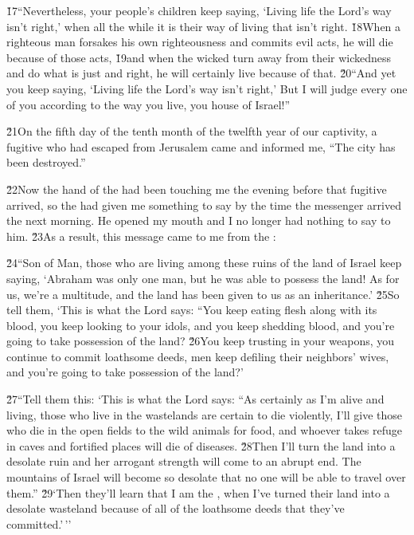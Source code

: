 \v{17}``Nevertheless, your people's children keep saying, `Living life the Lord's way isn't right,' when all the while it is their way of living that isn't right. \v{18}When a righteous man forsakes his own righteousness and commits evil acts, he will die because of those acts, \v{19}and when the wicked turn away from their wickedness and do what is just and right, he will certainly live because of that. \v{20}``And yet you keep saying, `Living life the Lord's way isn't right,' But I will judge every one of you according to the way you live, you house of Israel!''

\v{21}On the fifth day of the tenth month of the twelfth year of our captivity, a fugitive who had escaped from Jerusalem came and informed me, ``The city has been destroyed.''

\v{22}Now the hand of the  had been touching me the evening before that fugitive arrived, so the  had given me something to say by the time the messenger arrived the next morning. He opened my mouth and I no longer had nothing to say to him. \v{23}As a result, this message came to me from the :

\v{24}``Son of Man, those who are living among these ruins of the land of Israel keep saying, `Abraham was only one man, but he was able to possess the land! As for us, we're a multitude, and the land has been given to us as an inheritance.' \v{25}So tell them, `This is what the Lord  says: ``You keep eating flesh along with its blood, you keep looking to your idols, and you keep shedding blood, and you're going to take possession of the land? \v{26}You keep trusting in your weapons, you continue to commit loathsome deeds, men keep defiling their neighbors' wives, and you're going to take possession of the land?'

\v{27}``Tell them this: `This is what the Lord  says: ``As certainly as I'm alive and living, those who live in the wastelands are certain to die violently, I'll give those who die in the open fields to the wild animals for food, and whoever takes refuge in caves and fortified places will die of diseases. \v{28}Then I'll turn the land into a desolate ruin and her arrogant strength will come to an abrupt end. The mountains of Israel will become so desolate that no one will be able to travel over them.'' \v{29}`Then they'll learn that I am the , when I've turned their land into a desolate wasteland because of all of the loathsome deeds that they've committed.'\,''

